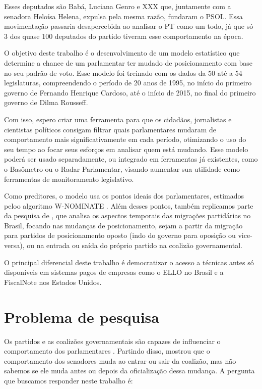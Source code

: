 Esses deputados são Babá, Luciana Genro e XXX que, juntamente com a senadora
Heloísa Helena, expulsa pela mesma razão, fundaram o PSOL. Essa movimentação
passaria desapercebida ao analisar o PT como um todo, já que só 3 dos quase 100
deputados do partido tiveram esse comportamento na época.

O objetivo deste trabalho é o desenvolvimento de um modelo estatístico que
determine a chance de um parlamentar ter mudado de posicionamento com base no
seu padrão de voto. Esse modelo foi treinado com os dados da
50\textordfeminine{} até a 54\textordfeminine{} legislaturas, compreendendo o
período de 20 anos de 1995, no início do primeiro governo de Fernando Henrique
Cardoso, até o início de 2015, no final do primeiro governo de Dilma Rousseff.

Com isso, espero criar uma ferramenta para que os cidadãos, jornalistas e
cientistas políticos consigam filtrar quais parlamentares mudaram de
comportamento mais significativamente em cada período, otimizando o uso do seu
tempo ao focar seus esforços em analisar quem está mudando. Esse modelo poderá
ser usado separadamente, ou integrado em ferramentas já existentes, como o
Basômetro ou o Radar Parlamentar, visando aumentar sua utilidade como
ferramentas de monitoramento legislativo.

Como preditores, o modelo usa os pontos ideais dos parlamentares, estimados
peloo algoritmo W-NOMINATE \cite{Poole1985,Poole2005}. Além desses pontos,
também replicamos parte da pesquisa de , que analisa os
aspectos temporais das migrações partidárias no Brasil, focando nas mudanças de
posicionamento, sejam a partir da migração para partidos de posicionamento
oposto (indo do governo para oposição ou vice-versa), ou na entrada ou saída do
próprio partido na coalizão governamental.

O principal diferencial deste trabalho é democratizar o acesso a técnicas
antes só disponíveis em sistemas pagos de empresas como o \gls{ELLO} no Brasil
e a FiscalNote nos Estados Unidos.

\section{Problema de pesquisa}

Os partidos e as coalizões governamentais são capazes de influenciar o
comportamento dos parlamentares \cite{Figueiredo2001,Santos2003}. Partindo
disso,  mostrou que o comportamento dos senadores muda ao
entrar ou sair da coalizão, mas não sabemos se ele muda antes ou depois da
oficialização dessa mudança. A pergunta que buscamos responder neste trabalho
é:

